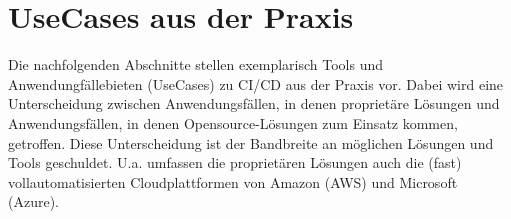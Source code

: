 \section{UseCases aus der Praxis}
\label{UseCases aus der Praxis}
Die nachfolgenden Abschnitte stellen exemplarisch Tools und Anwendungfällebieten (UseCases) zu \acrshort{CI}/\acrshort{CD} aus der Praxis vor. Dabei wird eine Unterscheidung zwischen Anwendungsfällen, in denen proprietäre Lösungen und Anwendungsfällen, in denen Opensource-Lösungen zum Einsatz kommen, getroffen. Diese Unterscheidung ist der Bandbreite an möglichen Lösungen und Tools geschuldet. U.a. umfassen die proprietären Lösungen auch die (fast) vollautomatisierten Cloudplattformen von Amazon (\acrshort{AWS}) und Microsoft (Azure).